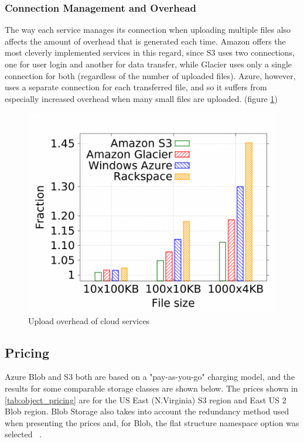 \subsubsection{Connection Management and Overhead}
The way each service manages its connection when uploading multiple files also affects the amount of overhead that is generated each time. Amazon offers the most cleverly implemented services in this regard, since S3 uses two connections, one for user login and another for data transfer, while Glacier uses only a single connection for both (regardless of the number of uploaded files). Azure, however, uses a separate connection for each transferred file, and so it suffers from especially increased overhead when many small files are uploaded. (figure \ref{fig:overhead})

\begin{figure} [h]
    \centering
    \includegraphics[scale=0.3]{images/overhead}
    \caption{\label{fig:overhead}Upload overhead of cloud services}
\end{figure}

\subsection{Pricing}
Azure Blob and S3 both are based on a "pay-as-you-go" charging model,  and the results for some comparable storage classes are shown below. The prices shown in \ref{tab:object_pricing} are for the US East (N.Virginia) S3 region and East US 2 Blob region. Blob Storage also takes into account the redundancy method used when presenting the prices and, for Blob, the flat structure namespace option was selected ~\cite{s3_pricing,blob_pricing}.

